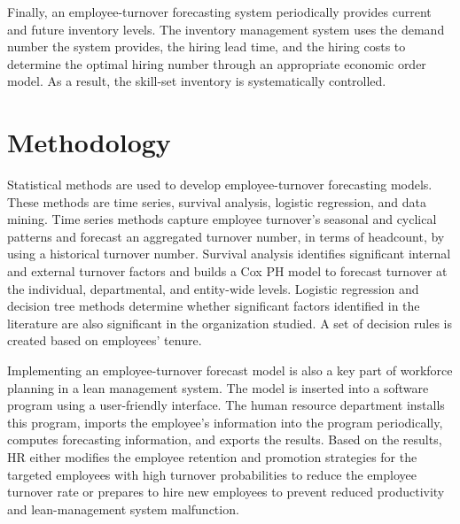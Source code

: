 Finally, an employee-turnover forecasting system periodically provides current and future inventory levels. The inventory management system uses the demand number the system provides, the hiring lead time, and the hiring costs to determine the optimal hiring number through an appropriate economic order model. As a result, the skill-set inventory is systematically controlled.


\section{Methodology}
Statistical methods are used to develop employee-turnover forecasting models. These methods are time series, survival analysis, logistic regression, and data mining. Time series methods capture employee turnover's seasonal and cyclical patterns and forecast an aggregated turnover number, in terms of headcount, by using a historical turnover number. Survival analysis identifies significant internal and external turnover factors and builds a Cox PH model to forecast turnover at the individual, departmental, and entity-wide levels. Logistic regression and decision tree methods determine whether significant factors identified in the literature are also significant in the organization studied. A set of decision rules is created based on employees' tenure. 
   
Implementing an employee-turnover forecast model is also a key part of workforce planning in a lean management system. The model is inserted into a software program using a user-friendly interface. The human resource department installs this program, imports the employee's information into the program periodically, computes forecasting information, and exports  the results. Based on the results, HR either modifies the employee retention and promotion strategies for the targeted employees with high turnover probabilities to reduce the employee turnover rate or prepares to hire new employees to prevent reduced productivity and lean-management system malfunction.


